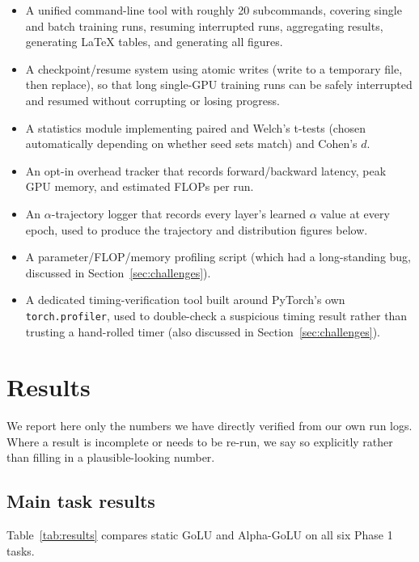 \documentclass[conference]{IEEEtran}
\begin{document}
\begin{itemize}
\item A unified command-line tool with roughly 20 subcommands, covering single and batch training runs, resuming interrupted runs, aggregating results, generating LaTeX tables, and generating all figures.
\item A checkpoint/resume system using atomic writes (write to a temporary file, then replace), so that long single-GPU training runs can be safely interrupted and resumed without corrupting or losing progress.
\item A statistics module implementing paired and Welch's t-tests (chosen automatically depending on whether seed sets match) and Cohen's $d$.
\item An opt-in overhead tracker that records forward/backward latency, peak GPU memory, and estimated FLOPs per run.
\item An $\alpha$-trajectory logger that records every layer's learned $\alpha$ value at every epoch, used to produce the trajectory and distribution figures below.
\item A parameter/FLOP/memory profiling script (which had a long-standing bug, discussed in Section~\ref{sec:challenges}).
\item A dedicated timing-verification tool built around PyTorch's own \texttt{torch.profiler}, used to double-check a suspicious timing result rather than trusting a hand-rolled timer (also discussed in Section~\ref{sec:challenges}).
\end{itemize}

\section{Results}
\label{sec:results}

We report here only the numbers we have directly verified from our own run logs. Where a result is incomplete or needs to be re-run, we say so explicitly rather than filling in a plausible-looking number.

\subsection{Main task results}
\label{sec:main-results}

Table~\ref{tab:results} compares static GoLU and Alpha-GoLU on all six Phase 1 tasks.
\end{document}
